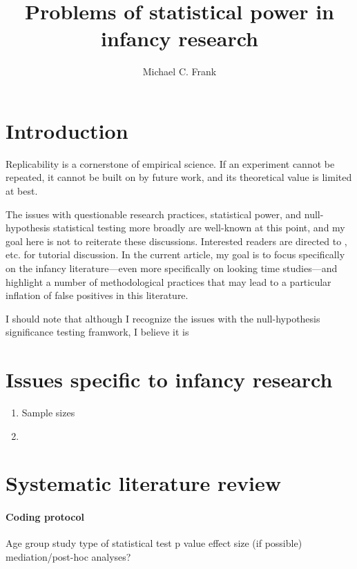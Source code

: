 \documentclass[man,noapacite]{apa2}
\title{Problems of statistical power in infancy research}
\author{Michael C. Frank}
\affiliation{Department of Psychology, Stanford University}
\begin{document}
\maketitle                            

\section{Introduction} 

Replicability is a cornerstone of empirical science. If an experiment cannot be repeated, it cannot be built on by future work, and its theoretical value is limited at best. 




The issues with questionable research practices, statistical power, and null-hypothesis statistical testing more broadly are well-known at this point, and my goal here is not to reiterate these discussions. Interested readers are directed to ,  etc. for tutorial discussion. In the current article, my goal is to focus specifically on the infancy literature---even more specifically on looking time studies---and highlight a number of methodological practices that may lead to a particular inflation of false positives in this literature. 

I should note that although I recognize the issues with the null-hypothesis significance testing framwork, I believe it is

\section{Issues specific to infancy research}


\begin{enumerate}
\item Sample sizes
\item 
\end{enumerate}

\section{Systematic literature review}

\paragraph{Coding protocol}

Age group
study
type of statistical test
p value
effect size (if possible)
mediation/post-hoc analyses?
\end{document}
